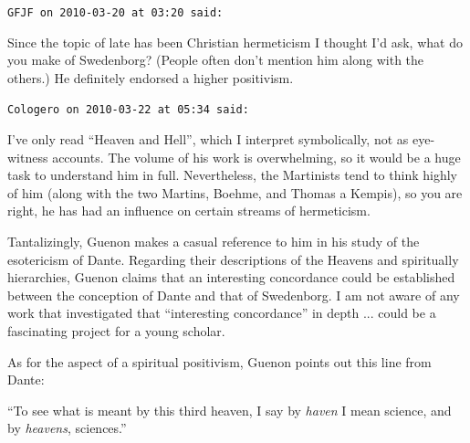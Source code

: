 \begin{footnotesize}
\begin{sffamily}
\texttt{GFJF on 2010-03-20 at 03:20 said:}

Since the topic of late has been Christian hermeticism I thought I'd ask, what do you make of Swedenborg? (People often don't mention him along with the others.) He definitely endorsed a higher positivism.

\hfill

\texttt{Cologero on 2010-03-22 at 05:34 said:}

I've only read ``Heaven and Hell'', which I interpret symbolically, not as eye-witness accounts. The volume of his work is overwhelming, so it would be a huge task to understand him in full. Nevertheless, the Martinists tend to think highly of him (along with the two Martins, Boehme, and Thomas a Kempis), so you are right, he has had an influence on certain streams of hermeticism.

Tantalizingly, Guenon makes a casual reference to him in his study of the esotericism of Dante. Regarding their descriptions of the Heavens and spiritually hierarchies, Guenon claims that an interesting concordance could be established between the conception of Dante and that of Swedenborg. I am not aware of any work that investigated that ``interesting concordance'' in depth ... could be a fascinating project for a young scholar.

As for the aspect of a spiritual positivism, Guenon points out this line from Dante:

``To see what is meant by this third heaven, I say by \emph{haven} I mean science, and by \emph{heavens}, sciences.''

\hfill

\end{sffamily}
\end{footnotesize}

